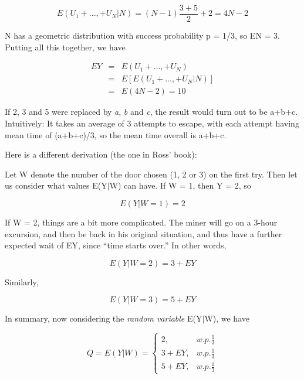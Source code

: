 \documentclass[11pt]{article}
\begin{document}
\begin{equation}
E(U_1+...,+U_N | N) = (N-1) \frac{3+5}{2} + 2 = 4N - 2
\end{equation}

N has a geometric distribution with success probability p = 1/3, so EN =
3.  Putting all this together, we have

\begin{eqnarray}
EY &=& E(U_1+...,+U_N) \\
&=& E\left [ E(U_1+...,+U_N | N) \right ] \\
&=& E(4N - 2) = 10
\end{eqnarray}

If 2, 3 and 5 were replaced by {\it a}, {\it b} and {\it c}, the result
would turn out to be a+b+c.  Intuitively:  It takes an average of 3
attempts to escape, with each attempt having mean time of (a+b+c)/3, so
the mean time overall is a+b+c.

Here is a different derivation (the one in Ross' book):

Let W denote the number of the door chosen (1, 2 or 3) on the first try.
Then let us consider what values E(Y$|$W) can have. If W = 1, then Y =
2, so

\begin{equation}
E(Y|W=1)=2
\end{equation}

If W = 2, things are a bit more complicated. The miner will go on a
3-hour excursion, and then be back in his original situation, and thus
have a further expected wait of EY, since ``time starts over.''  In
other words,

\begin{equation}
E(Y|W=2)=3+EY
\end{equation}


Similarly, 

\begin{equation}
E(Y|W=3)=5+EY
\end{equation}

In summary, now considering the \textit{random variable} E(Y$|$W), we have

\begin{equation}
Q=E(Y|W)=\left\{ \begin{array}{rl}
2, & w.p.\frac{1}{3}\\
3+EY, & w.p.\frac{1}{3}\\
5+EY, & w.p.\frac{1}{3}
\end{array}\right. 
\end{equation}
\end{document}
